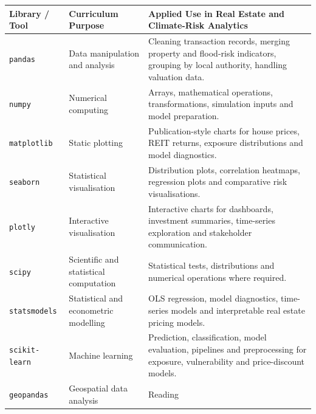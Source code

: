 \documentclass[
  a4paper,
]{article}
\newcounter{none} %
\begin{document}
{\def\LTcaptype{none} %
\begin{longtable}[]{@{}
  >{\raggedright\arraybackslash}p{}
  >{\raggedright\arraybackslash}p{}
  >{\raggedright\arraybackslash}p{}@{}}
\toprule\noalign{}
\begin{minipage}[b]{\linewidth}\raggedright
Library / Tool
\end{minipage} & \begin{minipage}[b]{\linewidth}\raggedright
Curriculum Purpose
\end{minipage} & \begin{minipage}[b]{\linewidth}\raggedright
Applied Use in Real Estate and Climate-Risk Analytics
\end{minipage} \\
\midrule\noalign{}
\endhead
\bottomrule\noalign{}
\endlastfoot
\texttt{pandas} & Data manipulation and analysis & Cleaning transaction
records, merging property and flood-risk indicators, grouping by local
authority, handling valuation data. \\
\texttt{numpy} & Numerical computing & Arrays, mathematical operations,
transformations, simulation inputs and model preparation. \\
\texttt{matplotlib} & Static plotting & Publication-style charts for
house prices, REIT returns, exposure distributions and model
diagnostics. \\
\texttt{seaborn} & Statistical visualisation & Distribution plots,
correlation heatmaps, regression plots and comparative risk
visualisations. \\
\texttt{plotly} & Interactive visualisation & Interactive charts for
dashboards, investment summaries, time-series exploration and
stakeholder communication. \\
\texttt{scipy} & Scientific and statistical computation & Statistical
tests, distributions and numerical operations where required. \\
\texttt{statsmodels} & Statistical and econometric modelling & OLS
regression, model diagnostics, time-series models and interpretable real
estate pricing models. \\
\texttt{scikit-learn} & Machine learning & Prediction, classification,
model evaluation, pipelines and preprocessing for exposure,
vulnerability and price-discount models. \\
\texttt{geopandas} & Geospatial data analysis & Reading

\end{longtable}}
\end{document}
